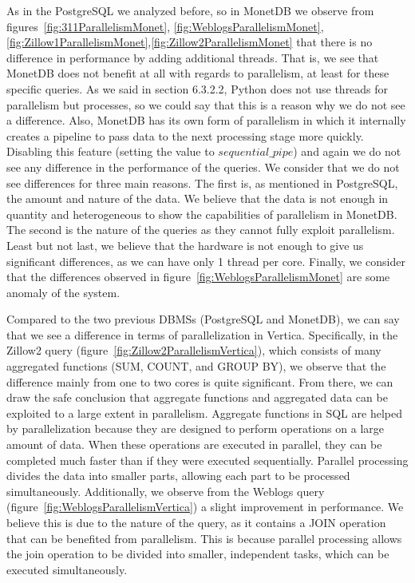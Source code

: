 As in the PostgreSQL we analyzed before, so in MonetDB we observe from figures~\ref{fig:311ParallelismMonet},
\ref{fig:WeblogsParallelismMonet},\ref{fig:Zillow1ParallelismMonet},\ref{fig:Zillow2ParallelismMonet} 
that there is no difference in performance by adding additional threads. That is, 
we see that MonetDB does not benefit at all with regards to parallelism, at least 
for these specific queries. As we said in section 6.3.2.2, Python does not use threads for 
parallelism but processes, so we could say that this is a reason why we do not see a difference. 
Also, MonetDB has its own form of parallelism in which it internally creates a pipeline to 
pass data to the next processing stage more quickly. Disabling this feature (setting the 
value to $sequential\_pipe$) and again we do not see any difference in the performance of 
the queries. We consider that we do not see differences for three main reasons. The first 
is, as mentioned in PostgreSQL, the amount and nature of the data. We believe that the data 
is not enough in quantity and heterogeneous to show the capabilities of parallelism in MonetDB. 
The second is the nature of the queries as they cannot fully exploit parallelism. Least but not 
last, we believe that the hardware is not enough to give us significant differences, as we can 
have only 1 thread per core. Finally, we consider that the differences observed in 
figure~\ref{fig:WeblogsParallelismMonet} are some anomaly of the system.

Compared to the two previous DBMSs (PostgreSQL and MonetDB), we can say that we see a 
difference in terms of parallelization in Vertica. Specifically, in the Zillow2 query 
(figure~\ref{fig:Zillow2ParallelismVertica}), which consists of many aggregated functions 
(SUM, COUNT, and GROUP BY), we observe that the difference mainly from one to two cores 
is quite significant. From there, we can draw the safe conclusion that aggregate functions 
and aggregated data can be exploited to a large extent in parallelism. Aggregate functions 
in SQL are helped by parallelization because they are designed to perform operations on a 
large amount of data. When these operations are executed in parallel, they can be completed 
much faster than if they were executed sequentially. Parallel processing divides the data into 
smaller parts, allowing each part to be processed simultaneously. Additionally, we observe 
from the Weblogs query (figure~\ref{fig:WeblogsParallelismVertica}) a slight improvement 
in performance. We believe this is due to the nature of the query, as it contains a JOIN 
operation that can be benefited from parallelism. This is because parallel processing 
allows the join operation to be divided into smaller, independent tasks, which can be 
executed simultaneously.


